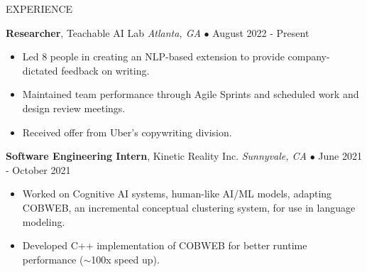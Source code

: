 \documentclass{resume} %
\begin{document}
\begin{rSection}{EXPERIENCE}
\vspace{-1mm}

\textbf{Researcher}, Teachable AI Lab \hfill \textit{Atlanta, GA} $\bullet$ August 2022 - Present
\vspace{-2mm}
\begin{itemize}
\itemsep -6pt {}
\item Led 8 people in creating an NLP-based extension to provide company-dictated feedback on writing.\n\item Maintained team performance through Agile Sprints and scheduled work and design review meetings.\n\item Received offer from Uber's copywriting division.\end{itemize}

\vspace{-1mm}

\textbf{Software Engineering Intern}, Kinetic Reality Inc. \hfill \textit{Sunnyvale, CA} $\bullet$ June 2021 - October 2021
\vspace{-2mm}
\begin{itemize}
\itemsep -6pt {}
\item Worked on Cognitive AI systems, human-like AI/ML models, adapting COBWEB, an incremental conceptual clustering system, for use in language modeling.\n\item Developed C++ implementation of COBWEB for better runtime performance (\(\sim \)100x speed up).\end{itemize}

\end{rSection}


\end{document}
